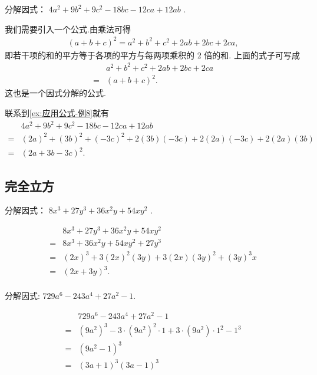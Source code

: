 \begin{example}\label{ex:应用公式-例8}
	分解因式： $4 a^{2}+9 b^{2}+9 c^{2}-18 b c-12 c a+12 a b$ .
\end{example}
\begin{solution}
	我们需要引入一个公式.由乘法可得
	\begin{align*}
		(a+b+c)^{2}=a^{2}+b^{2}+c^{2}+2 a b+2 b c+2 c a,
	\end{align*}
	即若干项的和的平方等于各项的平方与每两项乘积的 2 倍的和.
	上面的式子可写成
	\begin{align*}
		  & a^{2}+b^{2}+c^{2}+2 a b+2 b c+2 c a \\
		= & (a+b+c)^{2} .
	\end{align*}
	这也是一个因式分解的公式.

	联系到\autoref{ex:应用公式-例8}就有
	\begin{align*}
		  & 4 a^{2}+9 b^{2}+9 c^{2}-18 b c-12 c a+12 a b                         \\
		= & (2 a)^{2}+(3 b)^{2}+(-3 c)^{2}+2(3 b)(-3 c)+2(2 a)(-3 c)+2(2 a)(3 b) \\
		= & (2 a+3 b-3 c)^{2} .
	\end{align*}
\end{solution}

\subsection{完全立方}
\begin{example}
	分解因式： $8 x^{3}+27 y^{3}+36 x^{2} y+54 x y^{2}$ .
\end{example}
\begin{solution}
	\begin{align*}
		  & 8 x^{3}+27 y^{3}+36 x^{2} y+54 x y^{2}                \\
		= & 8 x^{3}+36 x^{2} y+54 x y^{2}+27 y^{3}                \\
		= & (2 x)^{3}+3(2 x)^{2}(3 y)+3(2 x)(3 y)^{2}+(3 y)^{3} x \\
		= & (2 x+3 y)^{3} .                                       \\
	\end{align*}
\end{solution}

\begin{example}
	分解因式: $729 a^{6}-243 a^{4}+27 a^{2}-1$.
\end{example}
\begin{solution}
	\begin{align*}
		  & 729 a^{6}-243 a^{4}+27 a^{2}-1                                                                                 \\
		= & \left(9 a^{2}\right)^{3}-3 \cdot\left(9 a^{2}\right)^{2} \cdot 1+3 \cdot\left(9 a^{2}\right) \cdot 1^{2}-1^{3} \\
		= & \left(9 a^{2}-1\right)^{3}                                                                                     \\
		= & (3 a+1)^{3}(3 a-1)^{3}
	\end{align*}
\end{solution}

